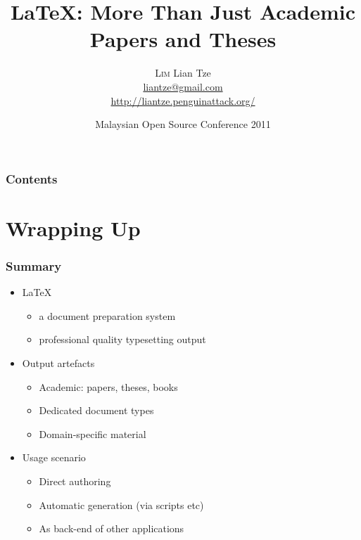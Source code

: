 \documentclass[xcolor={x11names,svgnames,dvipsnames}]{beamer}
\author[\textsc{Lim} Lian Tze]{\textsc{Lim} Lian Tze\\[1ex]%
{\small\url{liantze@gmail.com}\\[-.5ex]\url{http://liantze.penguinattack.org/}}\\[.5ex]\ccbyncsa}
\title{\LaTeX: More Than Just Academic Papers and Theses}
\date[\textsc{mosc} 2011]{Malaysian Open Source Conference 2011}%
\begin{document}
\begin{frame}
\maketitle
\end{frame}

\begin{frame}
\frametitle{Contents}
\tableofcontents
\end{frame}





\section{Wrapping Up}

\begin{frame}
\frametitle{Summary}
\begin{itemize}
\item<+-> \LaTeX
	\begin {itemize}
	\item a document preparation system
	\item professional quality typesetting output
	\end{itemize}
\item<+-> Output artefacts
	\begin{itemize}
	\item Academic: papers, theses, books
	\item Dedicated document types
	\item Domain-specific material
	\end{itemize}
\item<+-> Usage scenario
	\begin{itemize}
	\item Direct authoring
	\item Automatic generation (via scripts etc)
	\item As back-end of other applications
	\end{itemize}
\end{itemize}
\end{frame}


\end{document}
